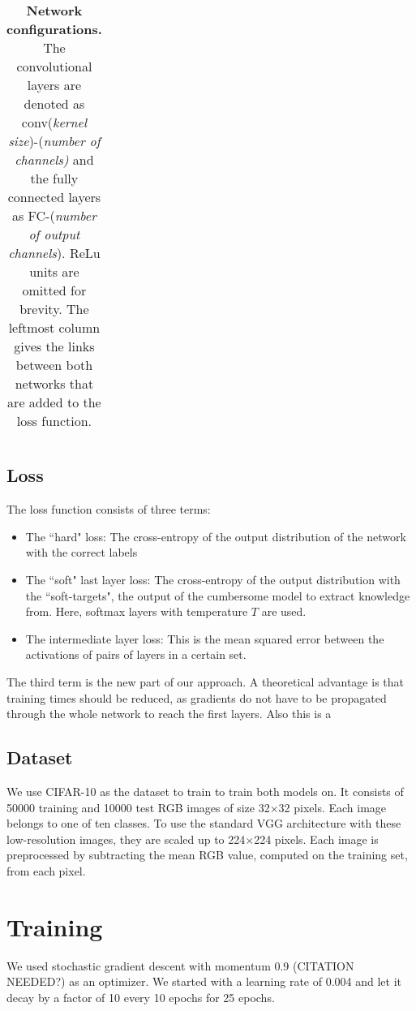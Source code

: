 \documentclass[10pt,twocolumn,letterpaper]{article}
\begin{document}
\begin{table}
\begin{center}
\begin{tabular}{|c|c|c|}
	\end{tabular}
	\end{center}
	\label{tab:network_architectures}
	\caption{\textbf{Network configurations.} The convolutional layers are denoted as conv(\textit{kernel size})-(\textit{number of channels)} and the fully 		connected layers as FC-(\textit{number of output channels}). ReLu units are omitted for brevity. The leftmost column gives the links between both networks that are added to the loss function.}
\end{table}

\subsection{Loss}
The loss function consists of three terms:
\begin{itemize}
	\item The ``hard" loss: The cross-entropy of the output distribution of the network with the correct labels
	\item The ``soft" last layer loss: The cross-entropy of the output distribution with the ``soft-targets", the output of the cumbersome model to extract knowledge from. Here, softmax layers with temperature $T$ are used.
	\item The intermediate layer loss: This is the mean squared error between the activations of pairs of layers in a certain set.
\end{itemize}
The third term is the new part of our approach. A theoretical advantage is that training times should be reduced, as gradients do not have to be propagated through the whole network to reach the first layers. Also this is a 



\subsection{Dataset}
We use CIFAR-10 \cite{krizhevsky2009learning} as the dataset to train to train both models on. It consists of 50000 training and 10000 test RGB images of size 32$\times$32 pixels. Each image belongs to one of ten classes. To use the standard VGG architecture with these low-resolution images, they are scaled up to 224$\times$224 pixels. Each image is preprocessed by subtracting the mean RGB value, computed on the training set, from each pixel. 
 

\section{Training}
We used stochastic gradient descent with momentum 0.9 (CITATION NEEDED?) as an optimizer. We started with a learning rate of 0.004 and let it decay by a factor of 10 every 10 epochs for 25 epochs. 
\end{document}
